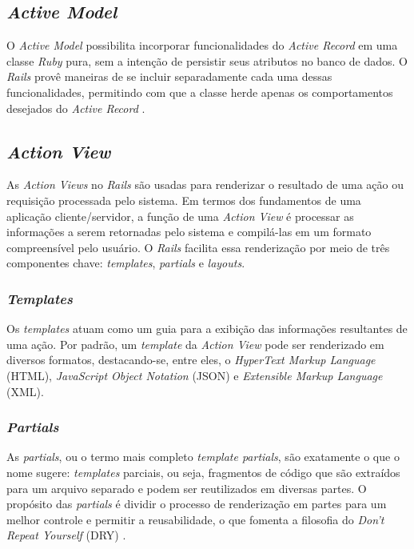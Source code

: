 \subsection{\textit{Active Model}}

O \textit{Active Model} possibilita incorporar funcionalidades do \textit{Active Record} em uma classe \textit{Ruby} pura, sem a intenção de persistir seus atributos no banco de dados. O \textit{Rails} provê maneiras de se incluir separadamente cada uma dessas funcionalidades, permitindo com que a classe herde apenas os comportamentos desejados do \textit{Active Record} \cite{activemodel-basics}. 

\subsection{\textit{Action View}}

As \textit{Action Views} no \textit{Rails} são usadas para renderizar o resultado de uma ação ou requisição processada pelo sistema. Em termos dos fundamentos de uma aplicação cliente/servidor, a função de uma \textit{Action View} é processar as informações a serem retornadas pelo sistema e compilá-las em um formato compreensível pelo usuário. O \textit{Rails} facilita essa renderização por meio de três componentes chave: \textit{templates}, \textit{partials} e \textit{layouts}.

\subsubsection{\textit{Templates}}

Os \textit{templates} atuam como um guia para a exibição das informações resultantes de uma ação. Por padrão, um \textit{template} da \textit{Action View} pode ser renderizado em diversos formatos, destacando-se, entre eles, o \textit{HyperText Markup Language} (HTML), \textit{JavaScript Object Notation} (JSON) e \textit{Extensible Markup Language} (XML).

\subsubsection{\textit{Partials}}

As \textit{partials}, ou o termo mais completo \textit{template partials}, são exatamente o que o nome sugere: \textit{templates} parciais, ou seja, fragmentos de código que são extraídos para um arquivo separado e podem ser reutilizados em diversas partes. O propósito das \textit{partials} é dividir o processo de renderização em partes para um melhor controle e permitir a reusabilidade, o que fomenta a filosofia do \textit{Don't Repeat Yourself} (DRY) \cite{actionview-overview}.

